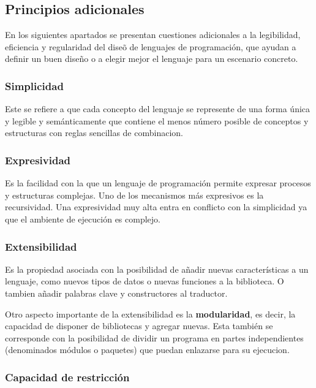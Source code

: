 \documentclass{article}
\begin{document}
\subsection{Principios adicionales}

En los siguientes apartados se presentan cuestiones adicionales a la legibilidad, eficiencia y regularidad del dise\~{o} de lenguajes de programaci\'on, que ayudan a definir un buen dise\~{n}o o a elegir mejor el lenguaje para un escenario concreto.

\subsubsection{Simplicidad}

Este se refiere a que cada concepto del lenguaje se represente de una forma \'unica y legible  y sem\'anticamente que contiene el menos n\'umero posible de conceptos y estructuras con reglas sencillas de combinacion.

\subsubsection{Expresividad}

Es la facilidad con la que un lenguaje de programaci\'on permite expresar procesos y estructuras complejas. Uno de los mecanismos m\'as expresivos es la recursividad. Una expresividad muy alta entra en conflicto con la simplicidad ya que el ambiente de ejecuci\'on es complejo.

\subsubsection{Extensibilidad}

Es la propiedad asociada con la posibilidad de a\~{n}adir nuevas caracter\'isticas a un lenguaje, como nuevos tipos de datos o nuevas funciones a la biblioteca. O tambien a\~{n}adir palabras clave y constructores al traductor. 

Otro aspecto importante de la extensibilidad es la \textbf{modularidad}, es decir, la capacidad de disponer de bibliotecas y agregar nuevas. Esta tambi\'en se corresponde con la posibilidad de dividir un programa en partes independientes (denominados m\'odulos o paquetes) que puedan enlazarse para su ejecucion.

\subsubsection{Capacidad de restricci\'on}
\end{document}
